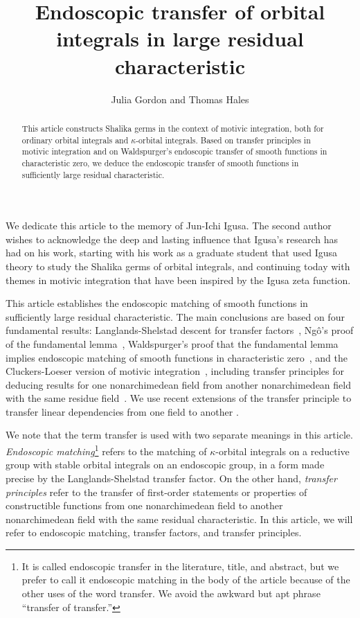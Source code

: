 \documentclass[12pt]{amsart}
\title{Endoscopic transfer of orbital integrals in large residual characteristic}
\author{Julia Gordon and Thomas Hales}
\theoremstyle{plain}
\theoremstyle{definition}
\begin{document}
\begin{abstract} This article constructs Shalika germs in the context
  of motivic integration, both for ordinary orbital integrals and
  $\kappa$-orbital integrals.  Based on transfer principles in motivic
  integration and on Waldspurger's endoscopic transfer of smooth
  functions in characteristic zero, we deduce the endoscopic
  transfer of smooth functions in sufficiently large residual
  characteristic.
\end{abstract}



\maketitle
\linenumbers


We dedicate this article to the memory of Jun-Ichi Igusa.  The second
author wishes to acknowledge the deep and lasting influence that
Igusa's research has had on his work, starting with his work as a
graduate student that used Igusa theory to study the Shalika germs of
orbital integrals, and continuing today with themes in motivic
integration that have been inspired by the Igusa zeta function.

\bigskip

This article establishes the endoscopic matching of smooth functions
in sufficiently large residual characteristic.  The main conclusions
are based on four fundamental results: Langlands-Shelstad descent for
transfer factors~\cite{LSxf}, Ng\^o's proof of the fundamental
lemma~\cite{ngo2010lemme}, Waldspurger's proof that the fundamental
lemma implies endoscopic matching of smooth functions in
characteristic zero~\cite{waldspurger1997lemme}, and the
Cluckers-Loeser version of motivic integration~\cite{CL}, including
transfer principles for deducing results for one nonarchimedean field
from another nonarchimedean field with the same residue
field~\cite{CLe}.  We use recent extensions of the transfer principle
to transfer linear dependencies from one field to another \cite{CGH2}.

We note that the term transfer is used with two separate meanings in
this article.  {\it Endoscopic matching}\footnote{It is called
  endoscopic transfer in the literature, title, and abstract, but we
  prefer to call it endoscopic matching in the body of the article
  because of the other uses of the word transfer. We avoid the awkward
  but apt phrase ``transfer of transfer.''}  refers to the matching of
$\kappa$-orbital integrals on a reductive group with stable orbital
integrals on an endoscopic group, in a form made precise by the
Langlands-Shelstad transfer factor.  On the other hand, {\it transfer
  principles} refer to the transfer of first-order statements or
properties of constructible functions from one nonarchimedean field to
another nonarchimedean field with the same residual characteristic.  In
this article, we will refer to endoscopic matching, transfer factors,
and transfer principles.
\end{document}
